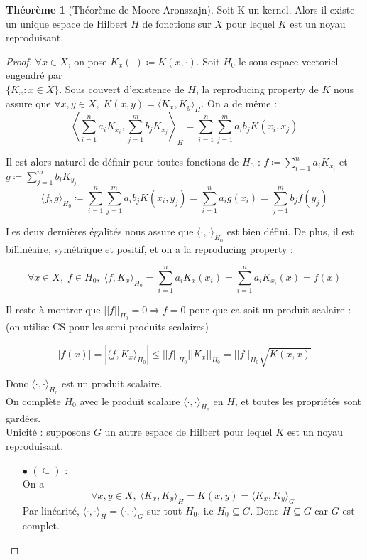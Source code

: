 \documentclass[a4paper, 11pt, french]{article}
\theoremstyle{definition}
\newtheorem{theorem}{Théorème}
\begin{document}
	\begin{theorem}[Théorème de Moore-Aronszajn]
	\label{th:mooaron}
	 	Soit K un kernel. Alors il existe un unique espace de Hilbert $H$ de fonctions sur $X$ pour lequel $K$ est un noyau reproduisant.
	\end{theorem}
	\begin{proof}
		$\forall x \in X$, on pose $K_x(\cdot) \coloneqq K(x, \cdot)$. Soit $H_0$ le sous-espace vectoriel engendré par \\ $\{K_x : x \in X\}$. Sous couvert d'existence de $H$, la reproducing property de $K$ nous assure que $\forall x, y \in X, \; K(x, y) = \langle K_x, K_y \rangle_H$. On a de même :
		\[\left\langle \sum_{i=1}^{n} a_i K_{x_i}, \sum_{j=1}^{m} b_j K_{x_j} \right\rangle_H = \sum_{i=1}^{n} \sum_{j=1}^{m} a_i b_j K(x_i, x_j)\]
		
		Il est alors naturel de définir pour toutes fonctions de $H_0$ : $f \coloneqq \sum_{i=1}^n a_i K_{x_i}$ et $g \coloneqq \sum_{j=1}^m b_i K_{y_j}$ 
		\[\langle f, g \rangle_{H_0} \coloneqq \sum_{i=1}^{n} \sum_{j=1}^{m} a_i b_j K(x_i, y_j) = \sum_{i=1}^n a_i g(x_i) = \sum_{j=1}^m b_j f(y_j)\]
		
		Les deux dernières égalités nous assure que $\langle \cdot, \cdot \rangle_{H_0}$ est bien défini. De plus, il est billinéaire, symétrique et positif, et on a la reproducing property :
		
		\[\forall x \in X, \; f \in H_0, \; \langle f, K_x \rangle_{H_0} = \sum_{i=1}^n a_i K_x(x_i) = \sum_{i=1}^n a_i K_{x_i}(x) = f(x)\]
		
		Il reste à montrer que $||f||_{H_0} = 0 \Rightarrow f = 0$ pour que ca soit un produit scalaire : (on utilise CS pour les semi produits scalaires)
		
		\[|f(x)| = |\langle f, K_x \rangle_{H_0}| \leq ||f||_{H_0} ||K_x||_{H_0} = ||f||_{H_0} \sqrt{K(x,x)} \]
		
		Donc $\langle \cdot, \cdot \rangle_{H_0}$ est un produit scalaire. \\
		
		On complète $H_0$ avec le produit scalaire $\langle \cdot, \cdot \rangle_{H_0}$ en $H$, et toutes les propriétés sont gardées. \\
		
		Unicité : supposons $G$ un autre espace de Hilbert pour lequel $K$ est un noyau reproduisant. 
		\begin{itemize}
			\item[$\bullet$]
			$(\subseteq)$ : \\
			On a
			\[\forall x, y \in X, \; \langle K_x, K_y \rangle_H = K(x, y) = \langle K_x, K_y \rangle_G\]
			Par linéarité, $\langle \cdot, \cdot \rangle_H = \langle \cdot, \cdot \rangle_G$ sur tout $H_0$, i.e $H_0 \subseteq G$. Donc $H \subseteq G$ car $G$ est complet.
			

\end{itemize}
\end{proof}
\end{document}
